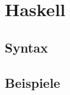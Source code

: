 \chapter{Haskell}
\section{Syntax}
\section{Beispiele}
\inputminted[linenos, numbersep=5pt, tabsize=4, frame=lines, label=fibonacci.hs]{haskell}{scripts/haskell/fibonacci.hs}


